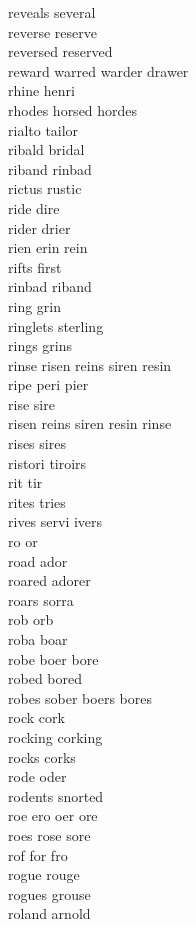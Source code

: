 reveals several\\
reverse reserve\\
reversed reserved\\
reward warred warder drawer\\
rhine henri\\
rhodes horsed hordes\\
rialto tailor\\
ribald bridal\\
riband rinbad\\
rictus rustic\\
ride dire\\
rider drier\\
rien erin rein\\
rifts first\\
rinbad riband\\
ring grin\\
ringlets sterling\\
rings grins\\
rinse risen reins siren resin\\
ripe peri pier\\
rise sire\\
risen reins siren resin rinse\\
rises sires\\
ristori tiroirs\\
rit tir\\
rites tries\\
rives servi ivers\\
ro or\\
road ador\\
roared adorer\\
roars sorra\\
rob orb\\
roba boar\\
robe boer bore\\
robed bored\\
robes sober boers bores\\
rock cork\\
rocking corking\\
rocks corks\\
rode oder\\
rodents snorted\\
roe ero oer ore\\
roes rose sore\\
rof for fro\\
rogue rouge\\
rogues grouse\\
roland arnold\\
